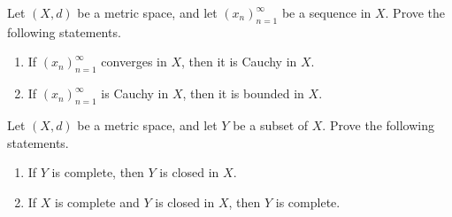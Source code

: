 \documentclass[12pt,letterpaper,boxed]{hmcpset}
\begin{document}
\begin{solution}

\end{solution}


\begin{problem}[Exercise 2.16]
Let $(X, d)$ be a metric space, and let $(x_n)_{n=1}^{\infty}$ be a sequence in $X$. Prove the following statements.
\vspace{-2mm}
	\begin{enumerate}
		\itemsep0em
		\item If $(x_n)_{n=1}^{\infty}$ converges in $X$, then it is Cauchy in $X$.
		\item If $(x_n)_{n=1}^{\infty}$ is Cauchy in $X$, then it is bounded in $X$.
	\end{enumerate}
\end{problem}

\begin{solution}

\end{solution}

\begin{problem}[Exercise 2.18]
Let $(X, d)$ be a metric space, and let $Y$ be a subset of $X$. Prove the following statements. 
\vspace{-2mm}
	\begin{enumerate}
		\itemsep0em
		\item If $Y$ is complete, then $Y$ is closed in $X$.
		\item If $X$ is complete and $Y$ is closed in $X$, then $Y$ is complete.
	\end{enumerate}
\end{problem}

\begin{solution}

\end{solution}
\end{document}
